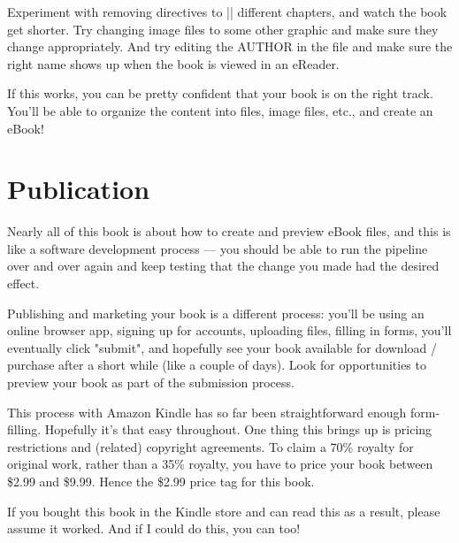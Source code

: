 Experiment with removing directives to \sverb|| different chapters, and watch the book get shorter. Try changing image files to some other graphic
and make sure they change appropriately. And try editing the AUTHOR in the  file and make sure the right name shows up when the book is viewed in an eReader.

If this works, you can be pretty confident that your book is on the right track. You'll be able to organize the content into \tex files, image files, etc., and create an eBook!


\section{Publication}

Nearly all of this book is about how to create and preview eBook files, and this is like a software development process
--- you should be able to run the pipeline over and over again and keep testing that the change you made had the desired effect.

Publishing and marketing your book is a different process: you'll be using an online browser app, signing up for accounts, uploading files, filling in forms,
you'll eventually click "submit", and hopefully see your book available for download / purchase after a short while (like a couple of days).
Look for opportunities to preview your book as part of the submission process.

This process with Amazon Kindle has so far been straightforward enough form-filling. Hopefully it's that easy throughout.
One thing this brings up is pricing restrictions and (related) copyright agreements. To claim a 70\% royalty for original work,
rather than a 35\% royalty, you have to price your book between \$2.99 and \$9.99. Hence the \$2.99 price tag for this book.

If you bought this book in the Kindle store and can read this as a result, please assume it worked. And if I could do this, you can too!





